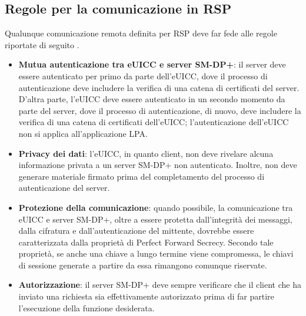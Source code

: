 \documentclass[10pt, twoside, openany]{book}
\begin{document}
\subsection{Regole per la comunicazione in RSP}
Qualunque comunicazione remota definita per RSP deve far fede alle regole riportate di seguito \cite{GSMA-docs-new}.
\begin{itemize}
\item \textbf{Mutua autenticazione tra eUICC e server SM-DP+}: il server deve essere autenticato per primo da parte dell'eUICC, dove il processo di autenticazione deve includere la verifica di una catena di certificati del server. D'altra parte, l'eUICC deve essere autenticato in un secondo momento da parte del server, dove il processo di autenticazione, di nuovo, deve includere la verifica di una catena di certificati dell'eUICC; l'autenticazione dell'eUICC non si applica all'applicazione LPA.
\item \textbf{Privacy dei dati}: l'eUICC, in quanto client, non deve rivelare alcuna informazione privata a un server SM-DP+ non autenticato. Inoltre, non deve generare materiale firmato prima del completamento del processo di autenticazione del server.
\item \textbf{Protezione della comunicazione}: quando possibile, la comunicazione tra eUICC e server SM-DP+, oltre a essere protetta dall'integrità dei messaggi, dalla cifratura e dall'autenticazione del mittente, dovrebbe essere caratterizzata dalla proprietà di Perfect Forward Secrecy. Secondo tale proprietà, se anche una chiave a lungo termine viene compromessa, le chiavi di sessione generate a partire da essa rimangono comunque riservate.
\item \textbf{Autorizzazione}: il server SM-DP+ deve sempre verificare che il client che ha inviato una richiesta sia effettivamente autorizzato prima di far partire l'esecuzione della funzione desiderata.
\end{itemize}
\end{document}
